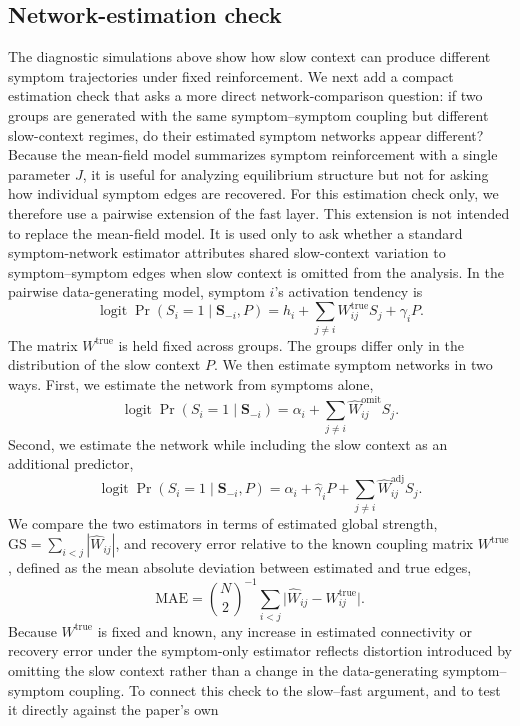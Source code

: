 \documentclass[man,12pt,floatsintext]{apa7}
\begin{document}
\subsection{Network-estimation check}\label{sec:network_estimation_check}
The diagnostic simulations above show how slow context can produce different symptom trajectories under fixed reinforcement. We next add a compact estimation check that asks a more direct network-comparison question: if two groups are generated with the same symptom--symptom coupling but different slow-context regimes, do their estimated symptom networks appear different?
Because the mean-field model summarizes symptom reinforcement with a single parameter \(J\), it is useful for analyzing equilibrium structure but not for asking how individual symptom edges are recovered. For this estimation check only, we therefore use a pairwise extension of the fast layer. This extension is not intended to replace the mean-field model. It is used only to ask whether a standard symptom-network estimator attributes shared slow-context variation to symptom--symptom edges when slow context is omitted from the analysis.
In the pairwise data-generating model, symptom \(i\)'s activation tendency is
\[
\operatorname{logit}\Pr(S_i=1\mid \mathbf S_{-i},P)
=
h_i+\sum_{j\neq i}W^{\mathrm{true}}_{ij}S_j+\gamma_iP .
\]
The matrix \(W^{\mathrm{true}}\) is held fixed across groups. The groups differ only in the distribution of the slow context \(P\). We then estimate symptom networks in two ways. First, we estimate the network from symptoms alone,
\[
\operatorname{logit}\Pr(S_i=1\mid \mathbf S_{-i})
=
\alpha_i+\sum_{j\neq i}\widehat W^{\mathrm{omit}}_{ij}S_j .
\]
Second, we estimate the network while including the slow context as an additional predictor,
\[
\operatorname{logit}\Pr(S_i=1\mid \mathbf S_{-i},P)
=
\alpha_i+\widehat\gamma_iP+\sum_{j\neq i}\widehat W^{\mathrm{adj}}_{ij}S_j .
\]
We compare the two estimators in terms of estimated global strength,
\(\mathrm{GS}=\sum_{i<j}|\widehat W_{ij}|\), and recovery error relative to the known coupling
matrix \(W^{\mathrm{true}}\), defined as the mean absolute deviation between estimated and true
edges,
\[
\mathrm{MAE}=\binom{N}{2}^{-1}\sum_{i<j}\bigl|\widehat W_{ij}-W^{\mathrm{true}}_{ij}\bigr| .
\]
Because \(W^{\mathrm{true}}\) is fixed and known, any increase in estimated connectivity or
recovery error under the symptom-only estimator reflects distortion introduced by omitting the
slow context rather than a change in the data-generating symptom--symptom coupling.
To connect this check to the slow--fast argument, and to test it directly against the paper's own
\end{document}
